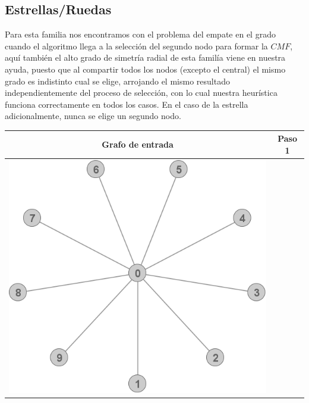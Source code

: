 \subsection{Estrellas/Ruedas}
	Para esta familia nos encontramos con el problema del empate en el grado cuando 
	el algoritmo llega a la selecci\'on del segundo nodo para formar la $CMF$, aqu\'i
	tambi\'en el alto grado de simetr\'ia radial de esta famil\'ia viene en nuestra 
	ayuda, puesto que al compartir todos los nodos (excepto el central) el mismo grado
	es indistinto cual se elige, arrojando el mismo resultado independientemente del 
	proceso de selecci\'on, con lo cual nuestra heur\'istica funciona correctamente
	en todos los casos. En el caso de la estrella adicionalmente, nunca se elige un 
	segundo nodo.

	\begin{center}
		\begin{tabular}{ |c||c| }
			\hline
			Grafo de entrada & Paso 1 \\
			\hline\hline
			\includegraphics[scale = 0.25]{img/ej3/constructiva_golosa/Star_st0.png} &

\end{tabular}
\end{center}
